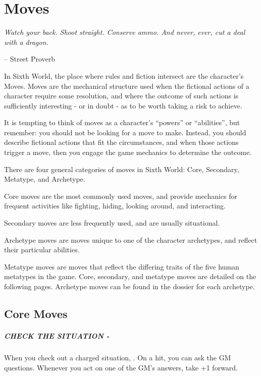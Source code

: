 \chapter{Moves} \label{moves}

\epigraph{\textit{Watch your back. Shoot straight. Conserve ammo. And never, ever, cut a deal with a dragon.}}{-- Street Proverb}

In Sixth World, the place where rules and fiction intersect are the character’s Moves. Moves are the mechanical structure used when the fictional actions of a character require some resolution, and where the outcome of such actions is sufficiently interesting - or in doubt - as to be worth taking a risk to achieve.

It is tempting to think of moves as a character’s ``powers'' or ``abilities'', but remember: you should not be looking for a move to make. Instead, you should describe fictional actions that fit the circumstances, and when those actions trigger a move, then you engage the game mechanics to determine the outcome.

There are four general categories of moves in Sixth World: Core, Secondary, Metatype, and Archetype.

Core moves are the most commonly used moves, and provide mechanics for frequent activities like fighting, hiding, looking around, and interacting.

Secondary moves are less frequently used, and are usually situational.

Archetype moves are moves unique to one of the character archetypes, and reflect their particular abilities.

Metatype moves are moves that reflect the differing traits of the five human metatypes in the game. Core, secondary, and metatype moves are detailed on the following pages. Archetype moves can be found in the dossier for each archetype.

\clearpage
\section{Core Moves}

\paragraph{CHECK THE SITUATION -} When you check out a charged situation, . On a hit, you can ask the GM questions. Whenever you act on one of the GM’s answers, take +1 forward.

